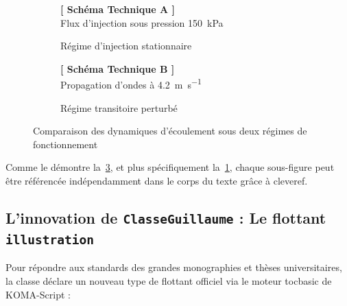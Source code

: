 \begin{figure}[htbp]
  \centering
  \begin{subfigure}[b]{0.46\textwidth}
    \centering
    \begin{tcolorbox}[colframe=secondaryColor, colback=white, boxrule=1pt, arc=4pt, width=\linewidth, halign=center]
      \vspace{0.8cm}
      {\large\sffamily\bfseries\color{secondaryColor} [ Schéma Technique A ]}\\[2mm]
      {\footnotesize Flux d'injection sous pression \qty{150}{\kilo\pascal}}
      \vspace{0.8cm}
    \end{tcolorbox}
    \caption{Régime d'injection stationnaire}
    \label{subfig:injection_stationnaire}
  \end{subfigure}
  \hfill
  \begin{subfigure}[b]{0.46\textwidth}
    \centering
    \begin{tcolorbox}[colframe=secondaryColor, colback=white, boxrule=1pt, arc=4pt, width=\linewidth, halign=center]
      \vspace{0.8cm}
      {\large\sffamily\bfseries\color{secondaryColor} [ Schéma Technique B ]}\\[2mm]
      {\footnotesize Propagation d'ondes à \qty{4.2}{\meter\per\second}}
      \vspace{0.8cm}
    \end{tcolorbox}
    \caption{Régime transitoire perturbé}
    \label{subfig:injection_transitoire}
  \end{subfigure}
  \caption{Comparaison des dynamiques d'écoulement sous deux régimes de fonctionnement}
  \label{fig:comparaison_regimes}
\end{figure}

Comme le démontre la~\cref{fig:comparaison_regimes}, et plus spécifiquement la~\cref{subfig:injection_stationnaire}, chaque sous-figure peut être référencée indépendamment dans le corps du texte grâce à \textsf{cleveref}.

\subsection{L'innovation de \texttt{ClasseGuillaume} : Le flottant \texttt{illustration}}
\label{subsec:flottant_illustration}

Pour répondre aux standards des grandes monographies et thèses universitaires, la classe déclare un nouveau type de flottant officiel via le moteur \textsf{tocbasic} de KOMA-Script :

